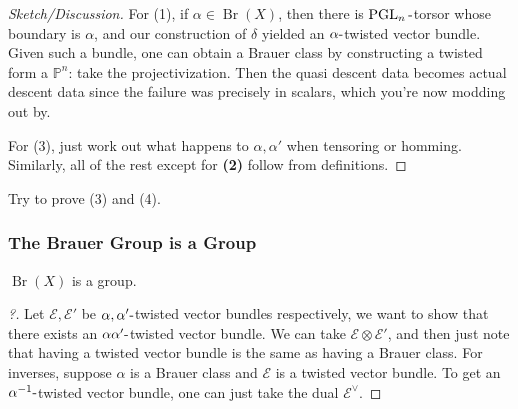 \begin{proof}[Sketch/Discussion]

\envlist

For (1), if \(\alpha\in \operatorname{Br}(X)\), then there is
\(\operatorname{PGL}_{n}{\hbox{-}}\)torsor whose boundary is \(\alpha\),
and our construction of \(\delta\) yielded an
\(\alpha{\hbox{-}}\)twisted vector bundle. Given such a bundle, one can
obtain a Brauer class by constructing a twisted form a
\({\mathbb{P}}^{n}\): take the projectivization. Then the quasi descent
data becomes actual descent data since the failure was precisely in
scalars, which you're now modding out by.

For (3), just work out what happens to \(\alpha, \alpha'\) when
tensoring or homming. Similarly, all of the rest except for \textbf{(2)}
follow from definitions.

\end{proof}

\begin{exercise}[?]

Try to prove (3) and (4).

\end{exercise}

\hypertarget{the-brauer-group-is-a-group}{%
\subsubsection{The Brauer Group is a
Group}\label{the-brauer-group-is-a-group}}

\begin{corollary}[?]

\(\operatorname{Br}(X)\) is a group.

\end{corollary}

\begin{proof}[?]

Let \(\mathcal{E}, \mathcal{E}'\) be \(\alpha,\alpha'{\hbox{-}}\)twisted
vector bundles respectively, we want to show that there exists an
\(\alpha\alpha'{\hbox{-}}\)twisted vector bundle. We can take
\(\mathcal{E}\otimes\mathcal{E}'\), and then just note that having a
twisted vector bundle is the same as having a Brauer class. For
inverses, suppose \(\alpha\) is a Brauer class and \(\mathcal{E}\) is a
twisted vector bundle. To get an \(\alpha^{-1}{\hbox{-}}\)twisted vector
bundle, one can just take the dual \(\mathcal{E}^\vee\).

\end{proof}

